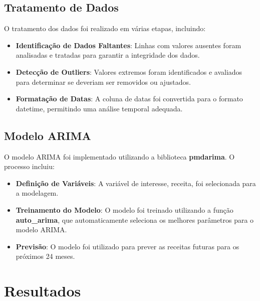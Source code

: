 \documentclass[a4paper,12pt]{article}
\begin{document}
\subsection{Tratamento de Dados}

O tratamento dos dados foi realizado em várias etapas, incluindo:

\begin{itemize}
    \item \textbf{Identificação de Dados Faltantes}: Linhas com valores ausentes foram analisadas e tratadas para garantir a integridade dos dados.
    \item \textbf{Detecção de Outliers}: Valores extremos foram identificados e avaliados para determinar se deveriam ser removidos ou ajustados.
    \item \textbf{Formatação de Datas}: A coluna de datas foi convertida para o formato datetime, permitindo uma análise temporal adequada.
\end{itemize}

\subsection{Modelo ARIMA}

O modelo ARIMA foi implementado utilizando a biblioteca \textbf{pmdarima}. O processo incluiu:

\begin{itemize}
    \item \textbf{Definição de Variáveis}: A variável de interesse, receita, foi selecionada para a modelagem.
    \item \textbf{Treinamento do Modelo}: O modelo foi treinado utilizando a função \textbf{auto\_arima}, que automaticamente seleciona os melhores parâmetros para o modelo ARIMA.
    \item \textbf{Previsão}: O modelo foi utilizado para prever as receitas futuras para os próximos 24 meses.
\end{itemize}

\section{Resultados}
\end{document}
